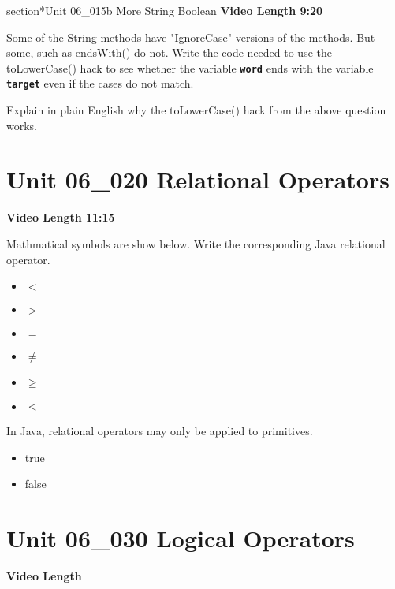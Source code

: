 \documentclass[letterpaper,12pt]{exam}
\newcommand{\unit}{Unit 06}
\begin{document}
\begin{questions}
section*{\unit\_015b More String Boolean } %
\noindent \textbf{Video Length 9:20}

\begin{samepage}
    \question Some of the String methods have "IgnoreCase" versions of the methods.  But some, such as endsWith() do not.  Write the code needed to use the toLowerCase() hack to see whether the variable \texttt{\textbf{word}} ends with the variable \texttt{\textbf{target}} even if the cases do not match.
    \vspace{5mm}
\end{samepage}

\begin{samepage}
    \question Explain in plain English why the toLowerCase() hack from the above question works.
    \vspace{5mm}
\end{samepage}

\section*{\unit\_020 Relational Operators} %
\noindent \textbf{Video Length 11:15}

\begin{samepage}
    \question Mathmatical symbols are show below.  Write the corresponding Java relational operator.
      \begin{itemize}
        \item $<$
        \item $>$
        \item $=$
        \item $\neq$
        \item $\ge$
        \item $\le$
        \vspace{5mm}
       \end{itemize}
\end{samepage}

\begin{samepage}
    \question In Java, relational operators may only be applied to primitives.
      \begin{itemize}
        \item true
        \item false
       \end{itemize}
\end{samepage}

\section*{\unit\_030 Logical Operators} %
\noindent \textbf{Video Length }



\end{questions}
\end{document}
